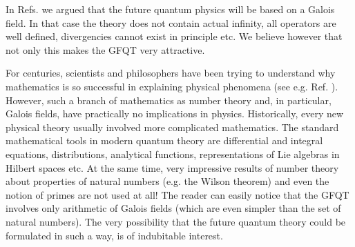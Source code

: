 \documentclass[a4paper,12pt]{article}%
\begin{document}
In Refs. \cite{lev1,lev2} we argued that the future quantum
physics will be based on a Galois field. In that case the
theory does not contain actual infinity, all operators are
well defined, divergencies cannot exist in principle etc.
We believe however that not only this makes the GFQT very 
attractive.

For centuries, scientists and philosophers have been trying to
understand why mathematics is so successful in explaining
physical phenomena (see e.g. Ref. \cite{Wigner1}). However,
such a branch of mathematics as number theory and, in 
particular, Galois fields, have practically no implications 
in physics.
Historically, every new physical theory usually involved
more complicated mathematics. The standard mathematical
tools in modern quantum theory are differential and
integral equations, distributions, analytical functions,
representations of Lie algebras in Hilbert spaces etc.
At the same time, very impressive results of number theory
about properties of natural numbers (e.g. the Wilson theorem)
and even the notion of primes are not used at all!
The reader can easily notice that the GFQT involves only 
arithmetic of Galois fields (which are even simpler than
the set of natural numbers). The very possibility that 
the future quantum theory could be formulated in such a way,
is of indubitable interest. 
\end{document}
